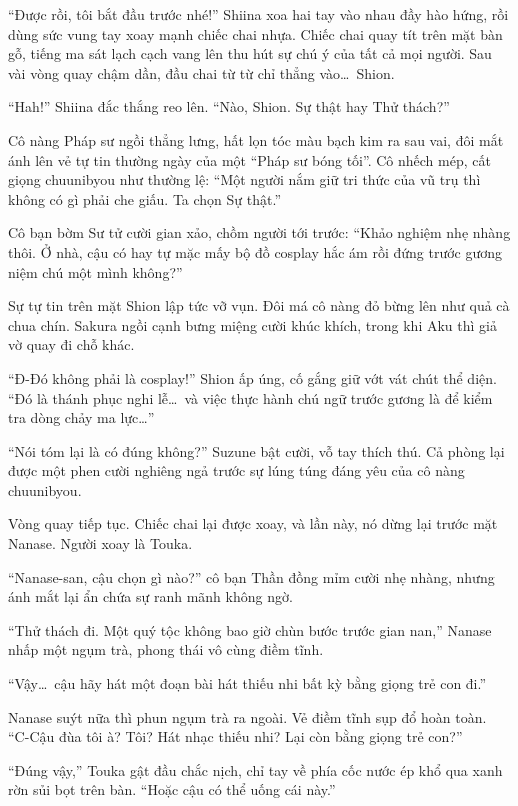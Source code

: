 \documentclass[../main.tex]{subfiles}
\begin{document}
``Được rồi, tôi bắt đầu trước nhé!'' Shiina xoa hai tay vào nhau đầy hào hứng, rồi dùng sức vung tay xoay mạnh chiếc chai nhựa. Chiếc chai quay tít trên mặt bàn gỗ, tiếng ma sát lạch cạch vang lên thu hút sự chú ý của tất cả mọi người. Sau vài vòng quay chậm dần, đầu chai từ từ chỉ thẳng vào\dots\ Shion.

``Hah!'' Shiina đắc thắng reo lên. ``Nào, Shion. Sự thật hay Thử thách?''

Cô nàng Pháp sư ngồi thẳng lưng, hất lọn tóc màu bạch kim ra sau vai, đôi mắt ánh lên vẻ tự tin thường ngày của một ``Pháp sư bóng tối''. Cô nhếch mép, cất giọng chuunibyou như thường lệ: ``Một người nắm giữ tri thức của vũ trụ thì không có gì phải che giấu. Ta chọn Sự thật.''

Cô bạn bờm Sư tử cười gian xảo, chồm người tới trước: ``Khảo nghiệm nhẹ nhàng thôi. Ở nhà, cậu có hay tự mặc mấy bộ đồ cosplay hắc ám rồi đứng trước gương niệm chú một mình không?''

Sự tự tin trên mặt Shion lập tức vỡ vụn. Đôi má cô nàng đỏ bừng lên như quả cà chua chín. Sakura ngồi cạnh bưng miệng cười khúc khích, trong khi Aku thì giả vờ quay đi chỗ khác.

``Đ-Đó không phải là cosplay!'' Shion ấp úng, cố gắng giữ vớt vát chút thể diện. ``Đó là thánh phục nghi lễ\dots\ và việc thực hành chú ngữ trước gương là để kiểm tra dòng chảy ma lực\dots''

``Nói tóm lại là có đúng không?'' Suzune bật cười, vỗ tay thích thú. Cả phòng lại được một phen cười nghiêng ngả trước sự lúng túng đáng yêu của cô nàng chuunibyou.

Vòng quay tiếp tục. Chiếc chai lại được xoay, và lần này, nó dừng lại trước mặt Nanase. Người xoay là Touka.

``Nanase-san, cậu chọn gì nào?'' cô bạn Thần đồng mỉm cười nhẹ nhàng, nhưng ánh mắt lại ẩn chứa sự ranh mãnh không ngờ.

``Thử thách đi. Một quý tộc không bao giờ chùn bước trước gian nan,'' Nanase nhấp một ngụm trà, phong thái vô cùng điềm tĩnh.

``Vậy\dots\ cậu hãy hát một đoạn bài hát thiếu nhi bất kỳ bằng giọng trẻ con đi.''

Nanase suýt nữa thì phun ngụm trà ra ngoài. Vẻ điềm tĩnh sụp đổ hoàn toàn. ``C-Cậu đùa tôi à? Tôi? Hát nhạc thiếu nhi? Lại còn bằng giọng trẻ con?''

``Đúng vậy,'' Touka gật đầu chắc nịch, chỉ tay về phía cốc nước ép khổ qua xanh rờn sủi bọt trên bàn. ``Hoặc cậu có thể uống cái này.''
\end{document}
